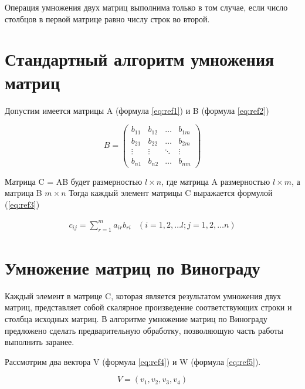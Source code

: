 \documentclass[12pt]{report}
\begin{document}
Операция умножения двух матриц выполнима только в том случае, если число столбцов в первой матрице равно числу строк во второй.

\section{Стандартный алгоритм умножения матриц}

Допустим имеется матрицы A (формула \ref{eq:ref1}) и B (формула \ref{eq:ref2})

\begin{equation}
	B = \left(
	\begin{array}{cccc}
			b_{11} & b_{12} & \ldots & b_{1m} \\
			b_{21} & b_{22} & \ldots & b_{2m} \\
			\vdots & \vdots & \ddots & \vdots \\
			b_{n1} & b_{n2} & \ldots & b_{nm}
		\end{array}
	\right)
	\label{eq:ref2}
\end{equation}

Матрица C = AB будет размерностью $l \times n$, 
где матрица A размерностью $l \times m$, а матрица B $m \times n$
Тогда каждый элемент матрицы C выражается формулой (\ref{eq:ref3})

\begin{equation}
	\begin{array}{cc}
		c_{ij} = \sum\limits_{r=1}^m a_{ir}b_{ri} & (i=1,2,\dots l; j=1,2,\dots n)
	\end{array}
	\label{eq:ref3}
\end{equation}

\section{Умножение матриц по Винограду}

Каждый элемент в матрице C, которая является результатом умножения двух матриц,
представляет собой скалярное произведение соответствующих строки и столбца исходных матриц. 
В алгоритме умножение матриц по Винограду предложено сделать предварительную обработку,
позволяющую часть работы выполнить заранее.

Рассмотрим два вектора V (формула \ref{eq:ref4}) и W (формула \ref{eq:ref5}).

\begin{equation}
	V = (v_1, v_2, v_3, v_4)
	\label{eq:ref4}
\end{equation}
\end{document}
